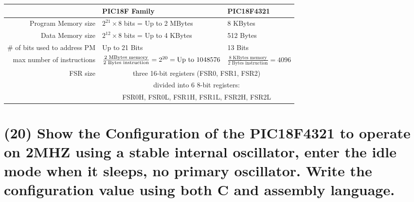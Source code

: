 \documentclass{article}
\begin{document}
\begin{tabular}{r|p{4.5cm}p{3.7cm}}
  \toprule
  &PIC18F Family&PIC18F4321\\
  \midrule
            Program Memory size & $2^{21}\times8$ bits = Up to  2 MBytes &   8 KBytes                                                      \\
               Data Memory size & $2^{12}\times8$ bits = Up to  4 KBytes & 512 Bytes                                                       \\
  \# of bits used to address PM &                        Up to 21 Bits   &  13 Bits                                                        \\
  \midrule
     max number of instructions & $\frac{2\text{ MBytes memory}}{2\text{ Bytes instruction}}\newline=2^{20}=\text{Up to }1048576$ & $\frac{8\text{ KBytes memory}}{2\text{ Bytes instruction}}=4096$ \\
  \midrule
                       FSR size & \multicolumn{2}{c}{three 16-bit registers (FSR0, FSR1, FSR2)}\\
                                & \multicolumn{2}{c}{divided into 6 8-bit registers:}\\
                                & \multicolumn{2}{c}{FSR0H, FSR0L, FSR1H, FSR1L, FSR2H, FSR2L}\\
  \bottomrule
\end{tabular}

\newpage

\section{(20) Show the Configuration of the PIC18F4321 to operate on 2MHZ using a stable internal oscillator, enter the idle mode when it sleeps, no primary oscillator. Write the configuration value using both C and assembly language.}
\end{document}
